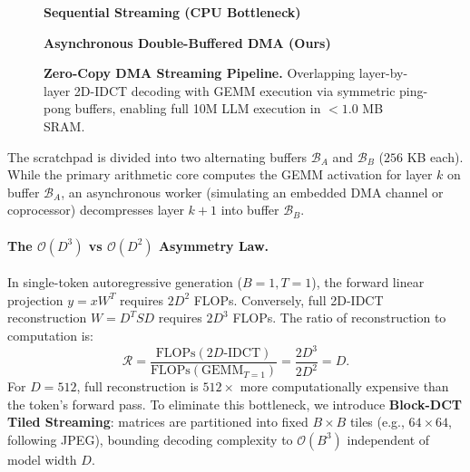 \documentclass[11pt,a4paper]{article}
\begin{document}
\begin{figure}[t]
    \centering
    \begin{minipage}{0.48\textwidth}
        \centering
        \textbf{Sequential Streaming (CPU Bottleneck)}\\
        \vspace{0.4em}
    \end{minipage}
    \hfill
    \begin{minipage}{0.48\textwidth}
        \centering
        \textbf{Asynchronous Double-Buffered DMA (Ours)}\\
        \vspace{0.4em}
    \end{minipage}
    \caption{\textbf{Zero-Copy DMA Streaming Pipeline.} Overlapping layer-by-layer 2D-IDCT decoding with GEMM execution via symmetric ping-pong buffers, enabling full 10M LLM execution in $<1.0$ MB SRAM.}
    \label{fig:dma_pipeline}
\end{figure}

The scratchpad is divided into two alternating buffers $\mathcal{B}_A$ and $\mathcal{B}_B$ ($256$ KB each). While the primary arithmetic core computes the GEMM activation for layer $k$ on buffer $\mathcal{B}_A$, an asynchronous worker (simulating an embedded DMA channel or coprocessor) decompresses layer $k+1$ into buffer $\mathcal{B}_B$. 

\paragraph{The $\mathcal{O}(D^3)$ vs $\mathcal{O}(D^2)$ Asymmetry Law.} In single-token autoregressive generation ($B=1, T=1$), the forward linear projection $y = x W^T$ requires $2 D^2$ FLOPs. Conversely, full 2D-IDCT reconstruction $W = D^T S D$ requires $2 D^3$ FLOPs. The ratio of reconstruction to computation is:
\begin{equation}
    \mathcal{R} = \frac{\text{FLOPs}(2D\text{-IDCT})}{\text{FLOPs}(\text{GEMM}_{T=1})} = \frac{2 D^3}{2 D^2} = D.
\end{equation}
For $D=512$, full reconstruction is $512\times$ more computationally expensive than the token's forward pass. To eliminate this bottleneck, we introduce \textbf{Block-DCT Tiled Streaming}: matrices are partitioned into fixed $B \times B$ tiles (e.g., $64 \times 64$, following JPEG), bounding decoding complexity to $\mathcal{O}(B^3)$ independent of model width $D$.
\end{document}
